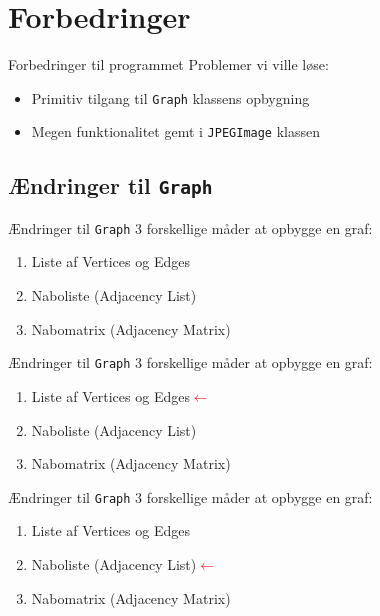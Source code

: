 \section{Forbedringer}
\begin{frame}{Forbedringer til programmet}{}
	Problemer vi ville løse:
	\begin{itemize}
		\item Primitiv tilgang til \lstinline|Graph| klassens opbygning
		\item Megen funktionalitet gemt i \lstinline|JPEGImage| klassen
	\end{itemize}
\end{frame}

\subsection{Ændringer til \lstinline|Graph|}
\begin{frame}{Ændringer til \lstinline|Graph|}{}
	3 forskellige måder at opbygge en graf:
	\begin{enumerate}
		\item Liste af Vertices og Edges
		\item Naboliste (Adjacency List)
		\item Nabomatrix (Adjacency Matrix)
	\end{enumerate}
\end{frame}
\begin{frame}[noframenumbering]{Ændringer til \lstinline|Graph|}{}
	3 forskellige måder at opbygge en graf:
	\begin{enumerate}
		\item Liste af Vertices og Edges\textcolor{red}{$\leftarrow$}
		\item Naboliste (Adjacency List)
		\item Nabomatrix (Adjacency Matrix)
	\end{enumerate}
\end{frame}
\begin{frame}[noframenumbering]{Ændringer til \lstinline|Graph|}{}
	3 forskellige måder at opbygge en graf:
	\begin{enumerate}
		\item Liste af Vertices og Edges
		\item Naboliste (Adjacency List)\textcolor{red}{$\leftarrow$}
		\item Nabomatrix (Adjacency Matrix)
	\end{enumerate}
\end{frame}
